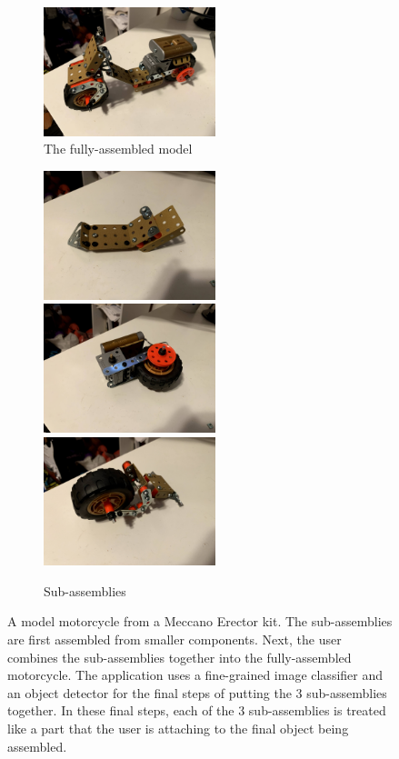 \begin{figure}
  \begin{subfigure}{\textwidth}
    \includegraphics[width=5cm]{figures/erector/full.jpg}
    \caption{The fully-assembled model}
  \end{subfigure}
  \begin{subfigure}{\textwidth}
    \includegraphics[width=5cm]{figures/erector/sub1.jpg}
    \includegraphics[width=5cm]{figures/erector/sub2.jpg}
    \includegraphics[width=5cm]{figures/erector/sub3.jpg}
    \caption{Sub-assemblies}
  \end{subfigure}
  \caption[A model motorcycle from a Meccano Erector kit]{
    A model motorcycle from a Meccano Erector kit.
    The sub-assemblies are first assembled from smaller components.
    Next, the user combines the sub-assemblies together into the fully-assembled
    motorcycle.
    The application uses a fine-grained image classifier and an object detector
    for the final steps of putting the 3 sub-assemblies together.
    In these final steps, each of the 3 sub-assemblies is treated like a part
    that the user is attaching to the final object being assembled.
  }\label{fig:erector}
\end{figure}

